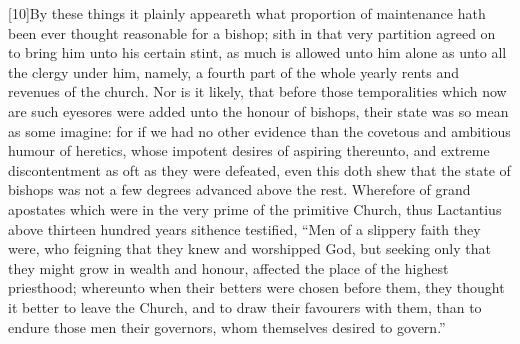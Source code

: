 [10]By these things it plainly appeareth what proportion of maintenance hath been ever thought reasonable for a bishop; sith in that very partition agreed on to bring him unto his certain stint, as much is allowed unto him alone as unto all the clergy under him, namely, a fourth part of the whole yearly rents and revenues of the church. Nor is it likely, that before those temporalities which now are such eyesores were added unto the honour of bishops, their state was so mean as some imagine: for if we had no other evidence than the covetous and ambitious humour of heretics, whose impotent desires of aspiring thereunto, and extreme discontentment as oft as they were defeated, even this doth shew that the state of bishops was not a few degrees advanced above the rest. Wherefore of grand apostates which were in the very prime of the primitive Church, thus Lactantius above thirteen hundred years sithence testified, “Men of a slippery faith  they were, who feigning that they knew and worshipped God, but seeking only that they might grow in wealth and honour, affected the place of the highest priesthood; whereunto when their betters were chosen before them, they thought it better to leave the Church, and to draw their favourers with them, than to endure those men their governors, whom themselves desired to govern.”

